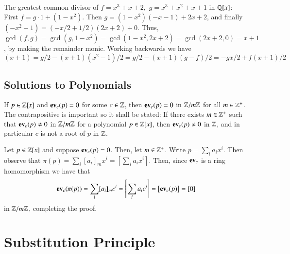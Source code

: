 \documentclass[12pt, a4paper, twoside, openright, titlepage]{book}
\begin{document}
\begin{eg}{}{}
    The greatest common divisor of $f = x^3 + x + 2,$ $g = x^3 + x^2 + x + 1$ in $\mathbb Q[x]$: First $f = g\cdot 1 + (1-x^2)$. Then $g = (1-x^2)(-x-1) + 2x+2$, and finally $(-x^2+1) = (-x/2+1/2)(2x+2) + 0$. Thus, $\gcd(f,g) = \gcd(g,1-x^2) = \gcd(1-x^2,2x+2) = \gcd(2x+2,0) = x+1$, by making the remainder monic. Working backwards we have $$(x+1) = g/2 - (x+1)(x^2-1)/2 = g/2 - (x+1)(g-f)/2 = -gx/2+f(x+1)/2$$
\end{eg}


\subsection{\textsection Solutions to Polynomials}

\begin{prop}{}{}
    If $p \in \mathbb Z[x]$ and $\operatorname{\bf{ev}}_c(p) = 0$ for some $c \in \mathbb Z$, then $\operatorname{\bf{ev}}_c(p) = 0$ in $\mathbb Z/m\mathbb Z$ for all $m \in \mathbb Z^{+}$. The contrapositive is important so it shall be stated: If there exists $m \in \mathbb Z^{+}$ such that $\operatorname{\bf{ev}}_c(p) \neq 0$ in $\mathbb Z/m\mathbb Z$ for a polynomial $p \in \mathbb Z[x]$, then $\operatorname{\bf{ev}}_c(p) \neq 0$ in $\mathbb Z$, and in particular $c$ is not a root of $p$ in $\mathbb Z$.
    \begin{proof*}{}{}
        Let $p \in \mathbb Z[x]$ and suppose $\operatorname{\bf{ev}}_c(p) = 0$. Then, let $m \in \mathbb Z^{+}$. Write $p = \sum_ia_ix^i$. Then observe that $\pi(p) = \sum_i[a_i]_mx^i = \left[\sum_ia_ix^i\right]$. Then, since $\operatorname{\bf{ev}}_c$ is a ring homomorphism we have that $$\operatorname{\bf{ev}}_c(\pi(p)) = \sum_i[a_i]_mc^i = \left[\sum_ia_ic^i\right] = \left[\operatorname{\bf{ev}}_c(p)\right] = [0]$$ in $\mathbb Z/m\mathbb Z$, completing the proof.
    \end{proof*}
\end{prop}

\section{\textsection Substitution Principle}
\end{document}
